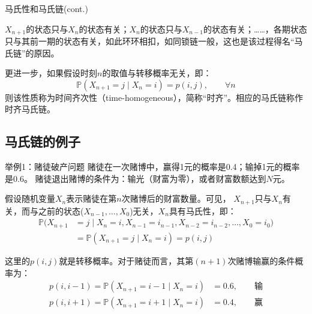 \documentclass[t]{beamer}
\renewcommand{\Pr}{\mathbb{P}}
\begin{document}
\begin{frame}{马氏性和马氏链(cont.)}
    \begin{center}
    \end{center}

    $X_{n+1}$的状态只与$X_n$的状态有关；$X_{n}$的状态只与$X_{n-1}$的状态有关；……，各期状态只与其前一期的状态有关，如此环环相扣，如同锁链一般，这也是该过程得名“马氏链”的原因。

    更进一步，如果假设时刻$n$的取值与转移概率无关，即：
\begin{equation*}
\Pr(X_{n+1}=j\;|\;{X_n=i})=p(i,j),\qquad \forall n
\end{equation*}
则该性质称为时间齐次性（time-homogeneous），简称“时齐”。相应的马氏链称作时齐马氏链。
\end{frame}

\subsection{马氏链的例子}
\begin{frame}{举例1：赌徒破产问题}
    \normalsize
    赌徒在一次赌博中，赢得1元的概率是0.4；输掉1元的概率是0.6。
    赌徒退出赌博的条件为：输光（财富为零），或者财富数额达到$N$元。
    
    假设随机变量$X_{n}$表示赌徒在第$n$次赌博后的财富数量。可见，
    $X_{n+1}$只与$X_n$有关，而与之前的状态($X_{n-1},\ldots,X_0$)无关，$X_n$具有{马氏性}，即：
    \[\begin{split}
    \Pr(X_{n+1}&=j\;|\;{X_n=i}, X_{n-1}=i_{n-1}, X_{n-2}=i_{n-2},\ldots, X_{0}=i_{0})\\&=\Pr(X_{n+1}=j\;|\;{X_n=i})=p(i,j)
    \end{split}\]

    这里的$p(i,j)$就是转移概率。对于赌徒而言，其第$(n+1)$次赌博输赢的条件概率为：
\[\begin{split}
p(i,i-1)=\Pr(X_{n+1}=i-1\;|\;X_n=i)&=0.6,\qquad \text{输}\\
p(i,i+1)=\Pr(X_{n+1}=i+1\;|\;X_n=i)&=0.4,\qquad \text{赢}
\end{split}\]
\end{frame}
\end{document}
